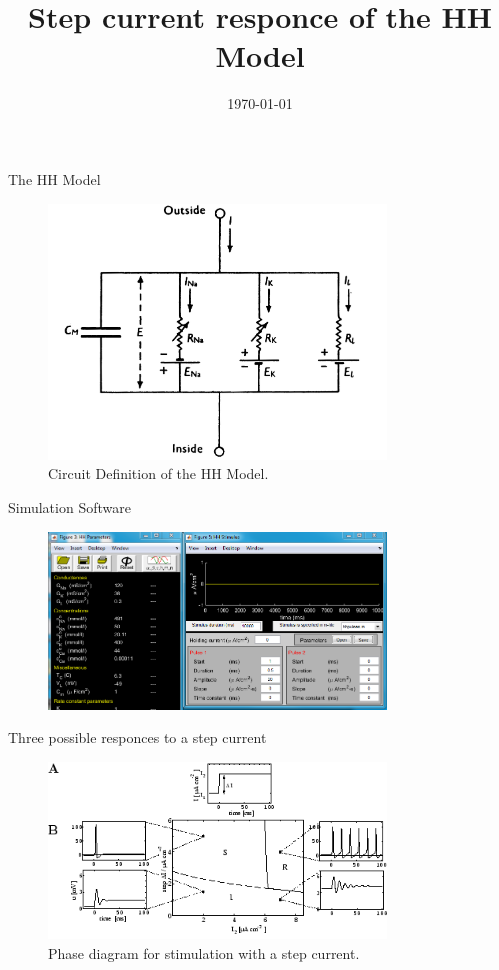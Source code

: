 \documentclass{beamer}
\title[A constant current applied to the HH model produces a train of action potentials.]{Step current responce of the HH Model}
\author[E.Ioannidis \& J.Hobin] {\
   \texorpdfstring{\
        \begin{columns}
            \column{.45\linewidth}
            \centering
            Eleftherios Ioannidis\\
            \href{mailto:elefthei@mit.edu}{elefthei@mit.edu}
            \column{.45\linewidth}
            \centering
            James Hobin\\
            \href{mailto:hobinjk@mit.edu}{hobinjk@mit.edu}
        \end{columns}
   }
   {Eleftherios Ioannidis \& James Hobin}
}
\institute{MIT EECS}
\date{\today}
\begin{document}
\begin{frame}
  \titlepage{}
\end{frame}

\begin{frame}{The HH Model}
  \begin{figure}
    \centering
    \includegraphics[width = 0.8\textwidth]{./pictures/hh.png}
    \caption{Circuit Definition of the HH Model.}
  \end{figure}
\end{frame}

\begin{frame}{Simulation Software}
  \begin{figure}
    \centering
    \includegraphics[width = 0.8\textwidth]{./pictures/api2.png}
  \end{figure}
\end{frame}



\begin{frame}{Three possible responces to a step current}
  \begin{figure}
    \centering
    \includegraphics[width = 0.8\textwidth]{./pictures/gerstner.png}
    \caption{Phase diagram for stimulation with a step current.}
  \end{figure}
\end{frame}
\end{document}
